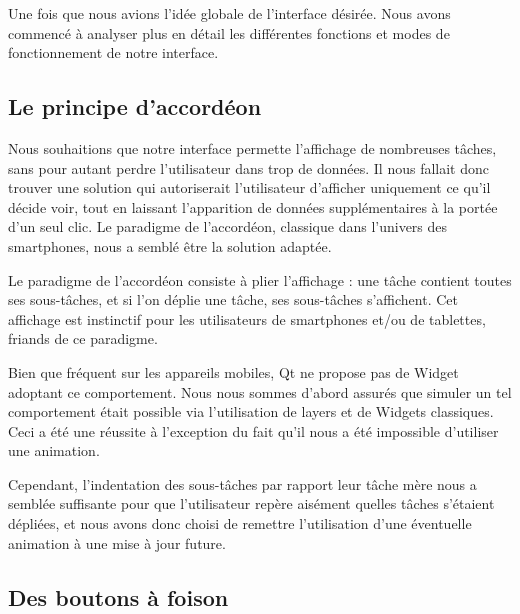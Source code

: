 \documentclass[11pt]{article}
\begin{document}
Une fois que nous avions l'idée globale de l'interface désirée. Nous
avons commencé à analyser plus en détail les différentes fonctions et
modes de fonctionnement de notre interface.


\subsection{Le principe d'accordéon}
\label{sec:accordeon}

Nous souhaitions que notre interface permette l'affichage de
nombreuses tâches, sans pour autant perdre l'utilisateur dans trop de
données. Il nous fallait donc trouver une solution qui autoriserait
l'utilisateur d'afficher uniquement ce qu'il décide voir, tout en
laissant l'apparition de données supplémentaires à la portée d'un seul
clic. Le paradigme de l'accordéon, classique dans l'univers des
smartphones, nous a semblé être la solution adaptée.

Le paradigme de l'accordéon consiste à plier l'affichage : une tâche
contient toutes ses sous-tâches, et si l'on déplie une tâche, ses
sous-tâches s'affichent. Cet affichage est instinctif pour les
utilisateurs de smartphones et/ou de tablettes, friands de ce
paradigme.

Bien que fréquent sur les appareils mobiles, Qt ne propose pas de
Widget adoptant ce comportement. Nous nous sommes d'abord assurés que
simuler un tel comportement était possible via l'utilisation de layers
et de Widgets classiques. Ceci a été une réussite à l'exception du
fait qu'il nous a été impossible d'utiliser une animation.

Cependant, l'indentation des sous-tâches par rapport leur tâche mère
nous a semblée suffisante pour que l'utilisateur repère aisément
quelles tâches s'étaient dépliées, et nous avons donc choisi de
remettre l'utilisation d'une éventuelle animation à une mise à jour
future.




\subsection{Des boutons à foison}
\end{document}
